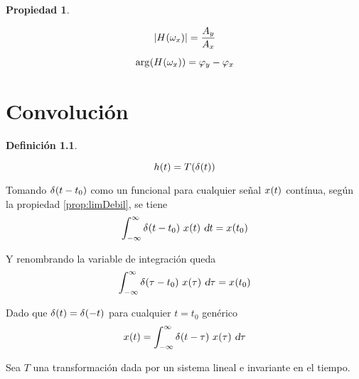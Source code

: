 \documentclass[a5paper,12pt,twoside]{book}
\newtheorem{defn}{{Definición}}[chapter]
\newtheorem{prop}{{Propiedad}}[chapter]
\begin{document}
\begin{mdframed}[style=MyFrame1]
    \begin{prop}
    \end{prop}
    \begin{gather*}
        \norm{\fx[H]{\omega_x}} = \frac{A_y}{A_x}
        \\[1ex]
        \fx[\arg]{\fx[H]{\omega_x}} = \varphi_y - \varphi_x
    \end{gather*}
\end{mdframed}


\chapter{Convolución}


\begin{mdframed}[style=MyFrame1]
    \begin{defn}
    \end{defn}
    \begin{equation*}
        \fx[h]{t} = \fx[T]{\fx[\delta]{t}}
    \end{equation*}
\end{mdframed}

Tomando $\fx[\delta]{t-t_0}$ como un funcional para cualquier señal $\fx[x]{t}$ contínua, según la propiedad \ref{prop:limDebil}, se tiene
\begin{equation*}
    \int_{-\infty}^\infty \fx[\delta]{t-t_0} \, \fx[x]{t} \, \dif t = \fx[x]{t_0}
\end{equation*}

Y renombrando la variable de integración queda
\begin{equation*}
    \int_{-\infty}^\infty \fx[\delta]{\tau-t_0} \, \fx[x]{\tau} \, \dif \tau = \fx[x]{t_0}
\end{equation*}

Dado que $\fx[\delta]{t} = \fx[\delta]{-t}$ para cualquier $t=t_0$ genérico
\begin{equation*}
    \fx[x]{t} = \int_{-\infty}^\infty \fx[\delta]{t-\tau} \, \fx[x]{\tau} \, \dif \tau
\end{equation*}

Sea $T$ una transformación dada por un sistema lineal e invariante en el tiempo.
\end{document}
